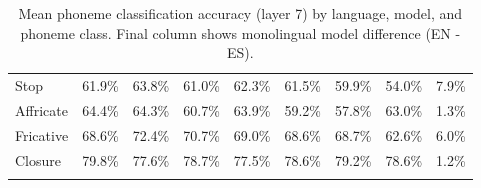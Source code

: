 \begin{table}
\begin{tabular}{l|ccccccc|c}
Stop & 61.9\% & 63.8\% & 61.0\% & 62.3\% & 61.5\% & 59.9\% & 54.0\% & 7.9\% \\
Affricate & 64.4\% & 64.3\% & 60.7\% & 63.9\% & 59.2\% & 57.8\% & 63.0\% & 1.3\% \\
Fricative & 68.6\% & 72.4\% & 70.7\% & 69.0\% & 68.6\% & 68.7\% & 62.6\% & 6.0\% \\
Closure & 79.8\% & 77.6\% & 78.7\% & 77.5\% & 78.6\% & 79.2\% & 78.6\% & 1.2\% \\
\addlinespace
\bottomrule
\end{tabular}
\caption{Mean phoneme classification accuracy (layer 7) by language, model, and phoneme class. Final column shows monolingual model difference (EN - ES).}
\label{app_tab:phoneme_class_acc_with_diff}
\end{table}
\clearpage





